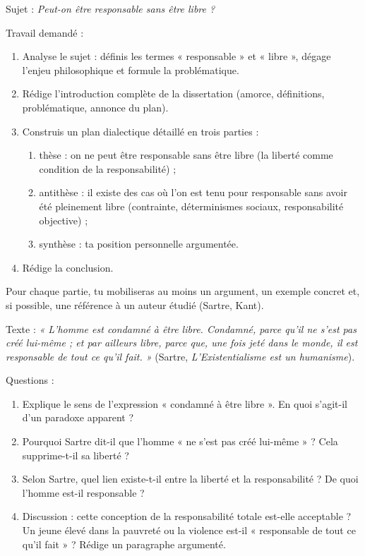 \documentclass[11pt]{article}
\begin{document}
\begin{exercice}
Sujet : \emph{Peut-on être responsable sans être libre ?}

Travail demandé :
\begin{enumerate}
\item Analyse le sujet : définis les termes « responsable » et « libre », dégage l'enjeu philosophique et formule la problématique.
\item Rédige l'introduction complète de la dissertation (amorce, définitions, problématique, annonce du plan).
\item Construis un plan dialectique détaillé en trois parties :
\begin{enumerate}
\item[a)] thèse : on ne peut être responsable sans être libre (la liberté comme condition de la responsabilité) ;
\item[b)] antithèse : il existe des cas où l'on est tenu pour responsable sans avoir été pleinement libre (contrainte, déterminismes sociaux, responsabilité objective) ;
\item[c)] synthèse : ta position personnelle argumentée.
\end{enumerate}
\item Rédige la conclusion.
\end{enumerate}
Pour chaque partie, tu mobiliseras au moins un argument, un exemple concret et, si possible, une référence à un auteur étudié (Sartre, Kant).
\end{exercice}

\begin{exercice}
Texte : \emph{« L'homme est condamné à être libre. Condamné, parce qu'il ne s'est pas créé lui-même ; et par ailleurs libre, parce que, une fois jeté dans le monde, il est responsable de tout ce qu'il fait. »} (Sartre, \emph{L'Existentialisme est un humanisme}).

Questions :
\begin{enumerate}
\item Explique le sens de l'expression « condamné à être libre ». En quoi s'agit-il d'un paradoxe apparent ?
\item Pourquoi Sartre dit-il que l'homme « ne s'est pas créé lui-même » ? Cela supprime-t-il sa liberté ?
\item Selon Sartre, quel lien existe-t-il entre la liberté et la responsabilité ? De quoi l'homme est-il responsable ?
\item Discussion : cette conception de la responsabilité totale est-elle acceptable ? Un jeune élevé dans la pauvreté ou la violence est-il « responsable de tout ce qu'il fait » ? Rédige un paragraphe argumenté.
\end{enumerate}
\end{exercice}
\end{document}
